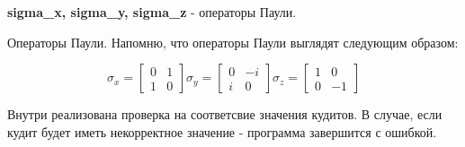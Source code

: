 \documentclass[12pt,fleqn]{article}
\begin{document}
        \begin{center}
            \textbf{sigma\_x, sigma\_y, sigma\_z} - операторы Паули.
        \end{center}

        Операторы Паули. Напомню, что операторы Паули выглядят следующим образом:

        $$
        {\sigma}_{x} = \begin{bmatrix}
                    0 & 1\\
                    1 & 0
                    \end{bmatrix}
        \sigma_{y} = \begin{bmatrix}
                    0 & -i\\
                    i & 0
                    \end{bmatrix}
        \sigma_{z} = \begin{bmatrix}
                    1 & 0\\
                    0 & -1
                    \end{bmatrix}
        $$
        
        Внутри реализована проверка на соответсвие значения кудитов. В случае, если кудит будет иметь некорректное значение - программа завершится с ошибкой.
\end{document}
